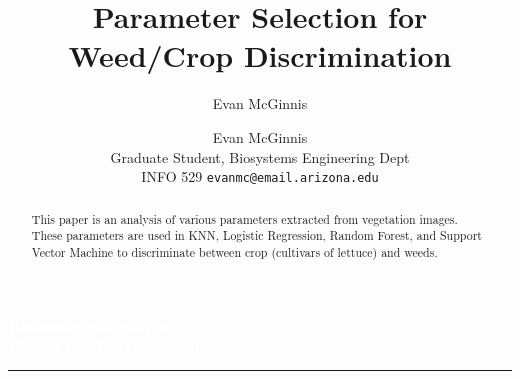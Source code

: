 \documentclass[letterpaper]{article}
\author{Evan McGinnis}
\title{Parameter Selection for Weed/Crop Discrimination}
\author{%
    Evan McGinnis \\
    Graduate Student, Biosystems Engineering Dept \\
    INFO 529
    \texttt{evanmc@email.arizona.edu}\vspace{40pt} \\
    }
\makeatletter
\def\printauthor{%
    {\large \@author}}
\makeatother
\begin{document}
\begin{titlepage}
\BgThispage
{}
\vspace*{1cm}
\noindent
\textcolor{white}{\Huge\textbf{\textsf{Parameter Selection in\\ Weed/Crop Discrimination}}}
\vspace*{2.5cm}\par
\noindent
\begin{minipage}{0.35\linewidth}
    \begin{flushright}
        \printauthor
    \end{flushright}
\end{minipage} \hspace{15pt}
%
\begin{minipage}{0.02\linewidth}
    \rule{1pt}{175pt}
\end{minipage} \hspace{-10pt}
%
\begin{minipage}{0.6\linewidth}
\vspace{5pt}
    \begin{abstract} 
This paper is an analysis of various parameters extracted from vegetation images. These parameters are used in KNN, Logistic Regression, Random Forest, and Support Vector Machine to discriminate between crop (cultivars of lettuce) and weeds.
    \end{abstract}
\end{minipage}
\end{titlepage}
\restoregeometry
\tableofcontents
\listoffigures
\newpage
%
%
\end{document}
